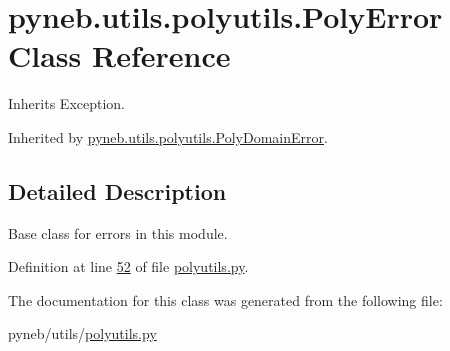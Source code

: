 \hypertarget{classpyneb_1_1utils_1_1polyutils_1_1_poly_error}{}\section{pyneb.\+utils.\+polyutils.\+Poly\+Error Class Reference}
\label{classpyneb_1_1utils_1_1polyutils_1_1_poly_error}


Inherits Exception.



Inherited by \hyperlink{classpyneb_1_1utils_1_1polyutils_1_1_poly_domain_error}{pyneb.\+utils.\+polyutils.\+Poly\+Domain\+Error}.



\subsection{Detailed Description}
\begin{DoxyVerb}Base class for errors in this module.\end{DoxyVerb}
 

Definition at line \hyperlink{polyutils_8py_source_l00052}{52} of file \hyperlink{polyutils_8py_source}{polyutils.\+py}.



The documentation for this class was generated from the following file\+:\begin{DoxyCompactItemize}
\item 
pyneb/utils/\hyperlink{polyutils_8py}{polyutils.\+py}\end{DoxyCompactItemize}
